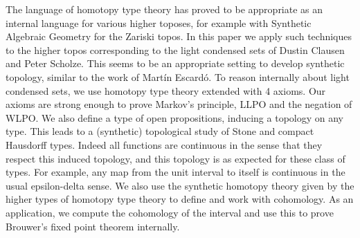 The language of homotopy type theory has proved to be appropriate as an internal language for various higher toposes, 
for example with Synthetic Algebraic Geometry for the Zariski topos.
In this paper we apply such techniques to the higher topos corresponding to the light condensed sets 
of Dustin Clausen and Peter Scholze.
This seems to be an appropriate setting to develop synthetic topology, similar to the work of 
Martín Escardó.
To reason internally about light condensed sets, we use homotopy type theory extended with 4 axioms.
Our axioms are strong enough to prove Markov's principle, LLPO and the negation of WLPO. 
We also define a type of open propositions, inducing a topology on any type. 
This leads to a (synthetic) topological study of Stone and compact Hausdorff types. 
Indeed all functions are continuous in the sense that they respect this induced topology, 
and this topology is as expected for these class of types.
For example, any map from the unit interval to itself is continuous in the usual epsilon-delta sense.
We also use the synthetic homotopy theory 
given by the higher types of homotopy type theory to define and 
work with cohomology.
As an application, we compute the cohomology of the interval and use this to prove Brouwer's fixed point theorem
internally. 
